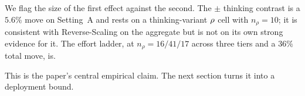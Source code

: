 We flag the size of the first effect against the second. The $\pm$ thinking contrast is a $5.6\%$ move on Setting~A and rests on a thinking-variant $\rho$ cell with $n_\rho = 10$; it is consistent with Reverse-Scaling on the aggregate but is not on its own strong evidence for it. The effort ladder, at $n_\rho = 16/41/17$ across three tiers and a $36\%$ total move, is.

This is the paper's central empirical claim. The next section turns it into a deployment bound.
